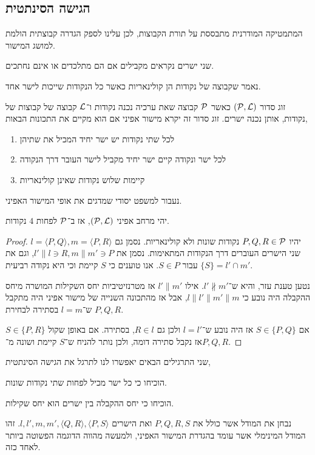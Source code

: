 \subsection{הגישה הסינתטית}
המתמטיקה המודרנית מתבססת על תורת הקבוצות, לכן עלינו לספק הגדרה קבוצתית הולמת למושג המישור.
\begin{definition}
	שני ישרים נקראים מקבילים אם הם מתלכדים או אינם נחתכים.
\end{definition}
\begin{definition}[קולינאריות]
	נאמר שקבוצה של נקודות הן קולינאריות כאשר כל הנקודות שייכות לישר אחד.
\end{definition}
\begin{definition}
	זוג סדור $(\mathcal{P}, \mathcal{L})$ כאשר $\mathcal{P}$ קבוצה שאת ערכיה נכנה נקודות ו־$\mathcal{L}$ קבוצה של קבוצות של נקודות, אותן נכנה ישרים.
	זוג סדור זה יקרא מישור אפיני אם הוא מקיים את התכונות הבאות,
	\begin{enumerate}
		\item לכל שתי נקודות יש ישר יחיד המכיל את שתיהן
		\item לכל ישר ונקודה קיים ישר יחיד מקביל לישר העובר דרך הנקודה
		\item קיימות שלוש נקודות שאינן קולינאריות
	\end{enumerate}
\end{definition}
נעבור למשפט יסודי שמדגים את אופי המישור האפיני.
\begin{theorem}
	יהי מרחב אפיני $(\mathcal{P}, \mathcal{L})$, אז ב־$\mathcal{P}$ לפחות $4$ נקודות.
\end{theorem}
\begin{proof}
	יהיו $P, Q, R \in \mathcal{P}$ נקודות שונות ולא קולינאריות.
	נסמן גם $l = \langle P, Q \rangle, m = \langle P, R \rangle$ שני הישרים העוברים דרך הנקודות המתאימות.
	נסמן את $l' \parallel l \ni R, m \parallel m' \ni P$, וגם את $\{ S \} = l' \cap m'$ עבור $S \in P$.
	אנו טוענים כי $S$ קיימת וכי היא נקודה רביעית.

	נטען טענת עזר, והיא ש־$l' \not\parallel m'$.
	אילו $l' \parallel m'$ אז מטרנזיטיביות יחס השקילות המושרה מיחס ההקבלה היה נובע כי $l \parallel l' \parallel m' \parallel m$, אבל אז מהתכונה השנייה של מישור אפיני היה מתקבל ש־$l = m$ בסתירה לבחירת $P, Q, R$.

	אם $S \in \{ P, Q \}$ אז היה נובע ש־$l = l'$ ולכן גם $R \in l$, בסתירה.
	אם באופן שקול $S \in \{ P, R \}$ אז נקבל סתירה דומה, ולכן נותר להניח ש־$S$ קיימת ושונה מ־$P, Q, R$.
\end{proof}
שני התרגילים הבאים יאפשרו לנו לתרגל את הגישה הסינתטית,
\begin{exercise}
	הוכיחו כי כל ישר מכיל לפחות שתי נקודות שונות.
\end{exercise}
\begin{exercise}
	הוכיחו כי יחס ההקבלה בין ישרים הוא יחס שקילות.
\end{exercise}
נבחן את המודל אשר כולל את $P, Q, R, S$ ואת הישרים $l, l', m, m', \langle Q, R \rangle, \langle P, S \rangle$.
זהו המודל המינימלי אשר עומד בהגדרת המישור האפיני, ולמעשה מהווה הדוגמה הפשוטה ביותר לאחד כזה.


